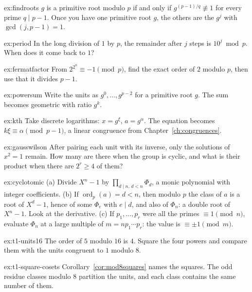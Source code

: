\begin{hint}{ex:findroots}
$g$ is a primitive root modulo $p$ if and only if $g^{(p-1)/q}\not\equiv1$ for every prime $q\mid p-1$. Once you have one primitive root $g$, the others are the $g^j$ with $\gcd(j,p-1)=1$.
\end{hint}
\begin{hint}{ex:period}
In the long division of $1$ by $p$, the remainder after $j$ steps is $10^j\bmod p$. When does it come back to $1$?
\end{hint}
\begin{hint}{ex:fermatfactor}
From $2^{2^n}\equiv-1\pmod p$, find the exact order of $2$ modulo $p$, then use that it divides $p-1$.
\end{hint}
\begin{hint}{ex:powersum}
Write the units as $g^0,\dots,g^{p-2}$ for a primitive root $g$. The sum becomes geometric with ratio $g^k$.
\end{hint}
\begin{hint}{ex:kth}
Take discrete logarithms: $x=g^\xi$, $a=g^\alpha$. The equation becomes $k\xi\equiv\alpha\pmod{p-1}$, a linear congruence from Chapter~\ref{ch:congruences}.
\end{hint}
\begin{hint}{ex:gausswilson}
After pairing each unit with its inverse, only the solutions of $x^2=1$ remain. How many are there when the group is cyclic, and what is their product when there are $2^r\ge4$ of them?
\end{hint}
\begin{hint}{ex:cyclotomic}
(a) Divide $X^n-1$ by $\prod_{d\mid n,\,d<n}\Phi_d$, a monic polynomial with integer coefficients. (b) If $\operatorname{ord}_p(a)=d<n$, then modulo $p$ the class of $a$ is a root of $X^d-1$, hence of some $\Phi_e$ with $e\mid d$, and also of $\Phi_n$: a double root of $X^n-1$. Look at the derivative. (c) If $p_1,\dots,p_r$ were all the primes $\equiv1\pmod n$, evaluate $\Phi_n$ at a large multiple of $m=np_1\cdots p_r$: the value is $\equiv\pm1\pmod m$.
\end{hint}
\begin{hint}{ex:t1-units16}
The order of $5$ modulo $16$ is $4$. Square the four powers and compare them with the units congruent to $1$ modulo $8$.
\end{hint}
\begin{hint}{ex:t1-square-cosets}
Corollary~\ref{cor:mod8squares} names the squares. The odd residue classes modulo $8$ partition the units, and each class contains the same number of them.
\end{hint}

